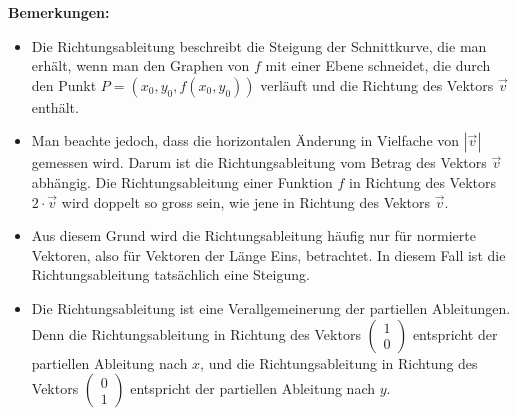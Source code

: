 \textbf{Bemerkungen:}
\begin{itemize}
	\item Die Richtungsableitung beschreibt die Steigung der Schnittkurve, die man erhält, wenn man den Graphen von \( f \) mit einer Ebene schneidet, die durch den Punkt \( P = (x_0, y_0, f(x_0, y_0)) \) verläuft und die Richtung des Vektors \( \vec{v} \) enthält.
	\item Man beachte jedoch, dass die horizontalen Änderung in Vielfache von $|\vec{v}|$ gemessen wird. Darum ist die Richtungsableitung vom Betrag des Vektors $\vec{v}$ abhängig. Die Richtungsableitung einer Funktion $f$ in Richtung des Vektors $2\cdot\vec{v}$ wird doppelt so gross sein, wie jene in Richtung des Vektors $\vec{v}$.
	\item Aus diesem Grund wird die Richtungsableitung häufig nur für normierte Vektoren, also für Vektoren der Länge Eins, betrachtet. In diesem Fall ist die Richtungsableitung tatsächlich eine Steigung.
	\item Die Richtungsableitung ist eine Verallgemeinerung der partiellen Ableitungen. Denn die Richtungsableitung in Richtung des Vektors \( \begin{pmatrix} 1 \\ 0 \end{pmatrix} \) entspricht der partiellen Ableitung nach \( x \), und die Richtungsableitung in Richtung des Vektors \( \begin{pmatrix} 0 \\ 1 \end{pmatrix} \) entspricht der partiellen Ableitung nach \( y \).
\end{itemize}









